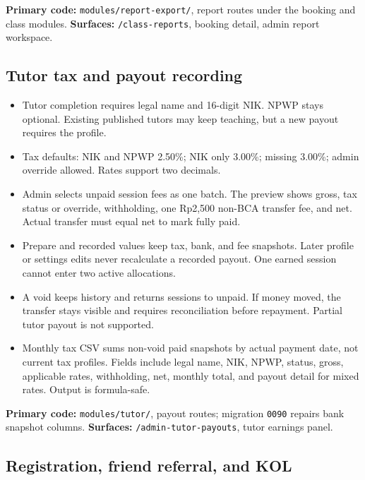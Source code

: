 \documentclass[11pt,a4paper]{article}
\newcommand{\code}[1]{\texttt{#1}}
\begin{document}
\noindent\textbf{Primary code:} \code{modules/report-export/}, report routes under the booking and class modules. \textbf{Surfaces:} \code{/class-reports}, booking detail, admin report workspace.

\subsection{Tutor tax and payout recording}

\begin{itemize}
	\item Tutor completion requires legal name and 16-digit NIK. NPWP stays optional. Existing published tutors may keep teaching, but a new payout requires the profile.
	\item Tax defaults: NIK and NPWP 2.50\%; NIK only 3.00\%; missing 3.00\%; admin override allowed. Rates support two decimals.
	\item Admin selects unpaid session fees as one batch. The preview shows gross, tax status or override, withholding, one Rp2,500 non-BCA transfer fee, and net. Actual transfer must equal net to mark fully paid.
	\item Prepare and recorded values keep tax, bank, and fee snapshots. Later profile or settings edits never recalculate a recorded payout. One earned session cannot enter two active allocations.
	\item A void keeps history and returns sessions to unpaid. If money moved, the transfer stays visible and requires reconciliation before repayment. Partial tutor payout is not supported.
	\item Monthly tax CSV sums non-void paid snapshots by actual payment date, not current tax profiles. Fields include legal name, NIK, NPWP, status, gross, applicable rates, withholding, net, monthly total, and payout detail for mixed rates. Output is formula-safe.
\end{itemize}

\noindent\textbf{Primary code:} \code{modules/tutor/}, payout routes; migration \code{0090} repairs bank snapshot columns. \textbf{Surfaces:} \code{/admin-tutor-payouts}, tutor earnings panel.

\subsection{Registration, friend referral, and KOL}
\end{document}

